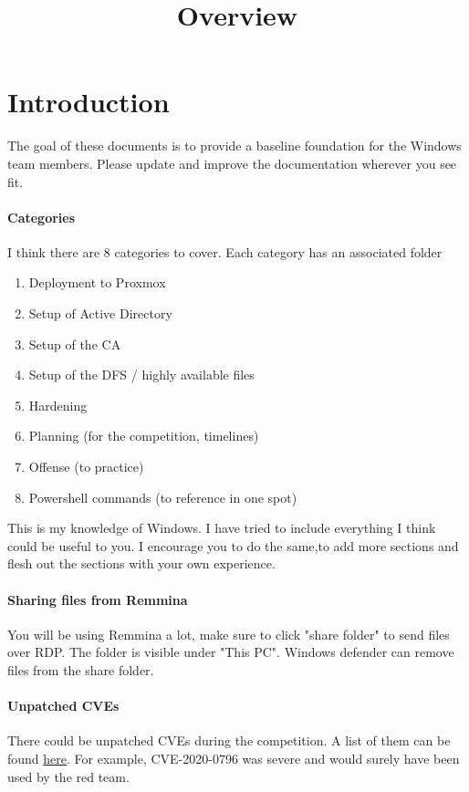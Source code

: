 \documentclass{article}
\title{Overview}
\begin{document}
\maketitle

\graphicspath{ {./Images/} }
\tableofcontents

\section{Introduction}
The goal of these documents is to provide a baseline foundation for the Windows team members.
Please update and improve the documentation wherever you see fit.

\paragraph{Categories} I think there are 8 categories to cover. Each category has an associated folder

\begin{enumerate}
        \item Deployment to Proxmox
        \item Setup of Active Directory
        \item Setup of the CA
        \item Setup of the DFS / highly available files
        \item Hardening
        \item Planning (for the competition, timelines)
        \item Offense (to practice)
        \item Powershell commands (to reference in one spot)
\end{enumerate}

This is my knowledge of Windows. I have tried to include everything I think could be useful to you.
I encourage you to do the same,to  add more sections and flesh out the sections with your own experience.

\paragraph{Sharing files from Remmina}
You will be using Remmina a lot, make sure to click "share folder" to send files over RDP.
The folder is visible under "This PC".
Windows defender can remove files from the share folder.

\paragraph{Unpatched CVEs}
There could be unpatched CVEs during the competition. A list of them can be found \href{https://stack.watch/product/microsoft/windows-server-2019/}{here}.
For example, CVE-2020-0796 was severe and would surely have been used by the red team.
\end{document}
